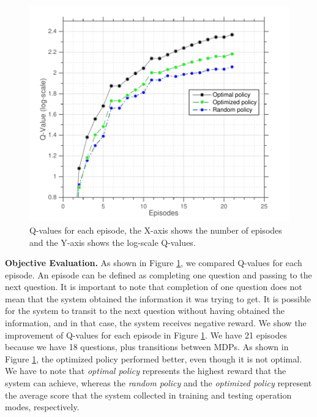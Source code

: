 \documentclass[letterpaper]{article}
\begin{document}
\begin{sloppy}
 \begin{figure}
 \centering
 \includegraphics[width=\columnwidth]{figures/q-values.pdf}
 \caption{Q-values for each episode, the X-axis shows the number of episodes and the Y-axis shows the log-scale Q-values.}
 \label{q-values}
 \end{figure}

{\bf Objective Evaluation.}  
As shown in Figure \ref{q-values}, we compared Q-values for each episode. An episode can be defined as completing one question and passing to the next question. It is important to note that completion of one question does not mean that the system obtained the information it was trying to get. It is possible for the system to transit to the next question without having obtained the information, and in that case, the system receives negative reward. 
We show the improvement of Q-values for each episode in Figure \ref{q-values}. We have  21 episodes because we have 18 questions, plus transitions between MDPs. As shown in Figure \ref{q-values}, the optimized policy performed better, even though it is not optimal. We have to note that \textit{optimal policy} represents the highest reward that the system can achieve, whereas the \textit{random policy} and the \textit{optimized policy} represent the average score that the system collected in training and testing operation modes, respectively.\\


\end{sloppy}
\end{document}
